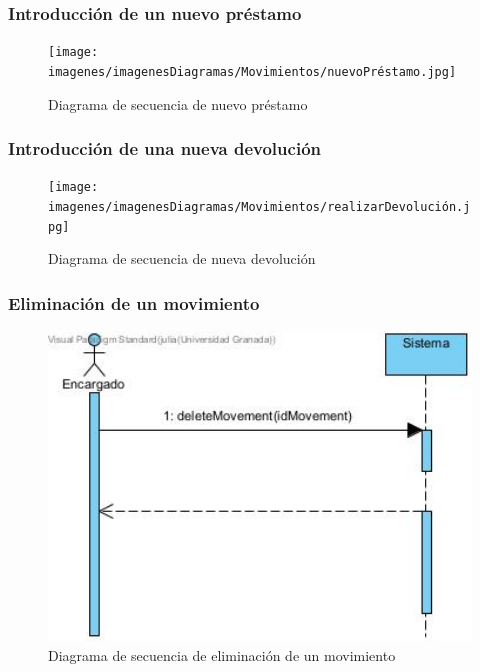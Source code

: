 \subsubsection{Introducción de un nuevo préstamo}

\begin{figure}[H]
	\centering
	\texttt{[image: imagenes/imagenesDiagramas/Movimientos/nuevoPréstamo.jpg]}
	\caption{Diagrama de secuencia de nuevo préstamo}
	\label{fig:seqdiag20}
\end{figure}

\subsubsection{Introducción de una nueva devolución}

\begin{figure}[H]
	\centering
	\texttt{[image: imagenes/imagenesDiagramas/Movimientos/realizarDevolución.jpg]}
	\caption{Diagrama de secuencia de nueva devolución}
	\label{fig:seqdiag21}
\end{figure}

\subsubsection{Eliminación de un movimiento}

\begin{figure}[H]
	\centering
	\includegraphics[width=1\textwidth]{imagenes/imagenesDiagramas/Movimientos/eliminarMovimiento.jpg}
	\caption{Diagrama de secuencia de eliminación de un movimiento}
	\label{fig:seqdiag22}
\end{figure}

